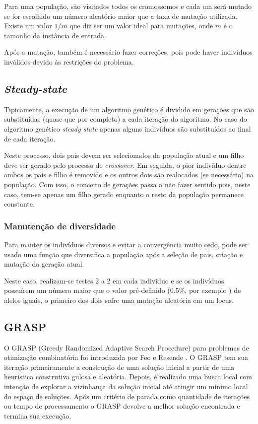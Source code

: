 \documentclass[12pt,a4paper]{article}
\begin{document}
         Para uma população, são visitados todos os cromossomos e cada um será mutado se for escolhido um número aleatório maior que a taxa de mutação utilizada. Existe um valor $1/m$
         \cite{gendreau2010handbook} que diz ser um valor ideal para mutações, onde $m$ é o tamanho da instância de entrada.
         
        Após a mutação, também é necessário fazer correções, pois pode haver indivíduos inválidos devido às restrições do problema.


    \subsection{\emph{Steady-state}}

        Tipicamente, a execução de um algoritmo genético é dividido em gerações que são substituídas (quase que por completo) a cada iteração do algoritmo. No caso do algoritmo genético
        \emph{steady state} apenas alguns indivíduos são substituídos ao final de cada iteração.

        Neste processo, dois pais devem ser selecionados da população atual e um filho deve ser gerado pelo processo de \emph{crossover}. Em seguida, o pior indivíduo dentre ambos os pais e filho é
        removido e os outros dois são realocados (se necessário) na população. Com isso, o conceito de gerações passa a não fazer sentido pois, neste caso, tem-se apenas um filho gerado enquanto o
        resto da população permanece constante.  

    \subsubsection{Manutenção de diversidade}

        Para manter os indivíduos diversos e evitar a convergência muito cedo, pode ser usado uma função que diversifica a população após a seleção de pais, criação e mutação da geração atual.

        Neste caso, realizam-se testes 2 a 2 em cada indivíduo e se os indivíduos possuírem um número maior que o valor pré-definido (0.5$\%$, por exemplo ) de alelos iguais, o primeiro dos
        dois sofre uma mutação aleatória em um locus.

\subsection{GRASP}

    O GRASP (Greedy Randomized Adaptive Search Procedure) para problemas de otimização combinatória foi introduzida por Feo e Resende \cite{feo1989probabilistic}. O GRASP tem sua iteração
    primeiramente a construção de uma solução inicial a partir de uma heurística construtiva gulosa e aleatória. Depois, é realizado uma busca local com intenção de explorar a vizinhança da
    solução inicial até atingir um mínimo local do espaço de soluções. Após um critério de parada como quantidade de iterações ou tempo de processamento o GRASP devolve a melhor solução
    encontrada e termina sua execução.
\end{document}
